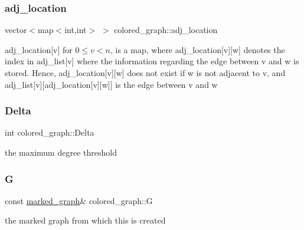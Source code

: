 \mbox{\label{classcolored__graph_ad657e7e86bee874d19dbc1765e1edaa7}} 
\subsubsection{\texorpdfstring{adj\+\_\+location}{adj\_location}}
{\footnotesize\ttfamily vector$<$map$<$int,int$>$ $>$ colored\+\_\+graph\+::adj\+\_\+location}



adj\+\_\+location\mbox{[}v\mbox{]} for $0 \leq v < n$, is a map, where adj\+\_\+location\mbox{[}v\mbox{]}\mbox{[}w\mbox{]} denotes the index in adj\+\_\+list\mbox{[}v\mbox{]} where the information regarding the edge between v and w is stored. Hence, adj\+\_\+location\mbox{[}v\mbox{]}\mbox{[}w\mbox{]} does not exist if w is not adjacent to v, and adj\+\_\+list\mbox{[}v\mbox{]}\mbox{[}adj\+\_\+location\mbox{[}v\mbox{]}\mbox{[}w\mbox{]}\mbox{]} is the edge between v and w 

\mbox{\label{classcolored__graph_a5b0e93eb40a20dc815c809dee11edc12}} 
\subsubsection{\texorpdfstring{Delta}{Delta}}
{\footnotesize\ttfamily int colored\+\_\+graph\+::\+Delta}



the maximum degree threshold 

\mbox{\label{classcolored__graph_a39186b56cad58c368d6947656976e18d}} 
\subsubsection{\texorpdfstring{G}{G}}
{\footnotesize\ttfamily const \hyperlink{classmarked__graph}{marked\+\_\+graph}\& colored\+\_\+graph\+::G}



the marked graph from which this is created 

